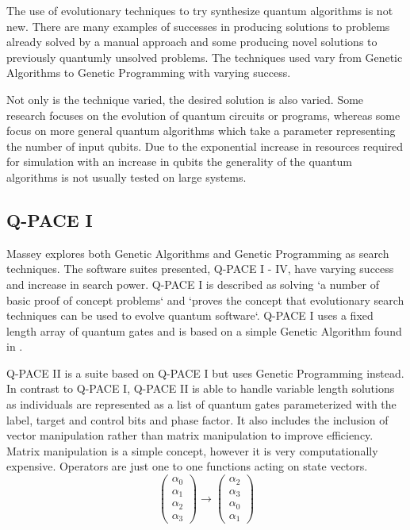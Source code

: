 \documentclass[authoryearcitations]{UoYCSproject}
\begin{document}
The use of evolutionary techniques to try synthesize quantum algorithms is not new.
There are many examples of successes in producing solutions to problems already solved by a manual approach and some producing novel solutions to previously quantumly unsolved problems.
The techniques used vary from Genetic Algorithms to Genetic Programming with varying success.

Not only is the technique varied, the desired solution is also varied.
Some research focuses on the evolution of quantum circuits or programs, whereas some focus on more general quantum algorithms which take a parameter representing the number of input qubits.
Due to the exponential increase in resources required for simulation with an increase in qubits the generality of the quantum algorithms is not usually tested on large systems.

\subsection{Q-PACE I}
Massey\cite{masseythesis,masseymeng} explores both Genetic Algorithms and Genetic Programming as search techniques.
The software suites presented, Q-PACE I - IV, have varying success and increase in search power.
Q-PACE I\cite{masseymeng} is described as solving `a number of basic proof of concept problems`\cite{masseythesis} and `proves the concept that evolutionary search techniques can be used to evolve quantum software`\cite{masseythesis}.
Q-PACE I uses a fixed length array of quantum gates and is based on a simple Genetic Algorithm found in \cite{1989goldberg}.

Q-PACE II\cite{masseythesis} is a suite based on Q-PACE I but uses Genetic Programming instead.
In contrast to Q-PACE I, Q-PACE II is able to handle variable length solutions as individuals are represented as a list of quantum gates parameterized with the label, target and control bits and phase factor.
It also includes the inclusion of vector manipulation rather than matrix manipulation to improve efficiency.
Matrix manipulation is a simple concept, however it is very computationally expensive.
Operators are just one to one functions acting on state vectors.
\begin{equation}
 \begin{pmatrix}
\alpha_0\\
\alpha_1\\
\alpha_2\\
\alpha_3
\end{pmatrix}
\rightarrow
 \begin{pmatrix}
\alpha_2\\
\alpha_3\\
\alpha_0\\
\alpha_1
\end{pmatrix}
\label{vectormanipulation}
\end{equation}
\end{document}
